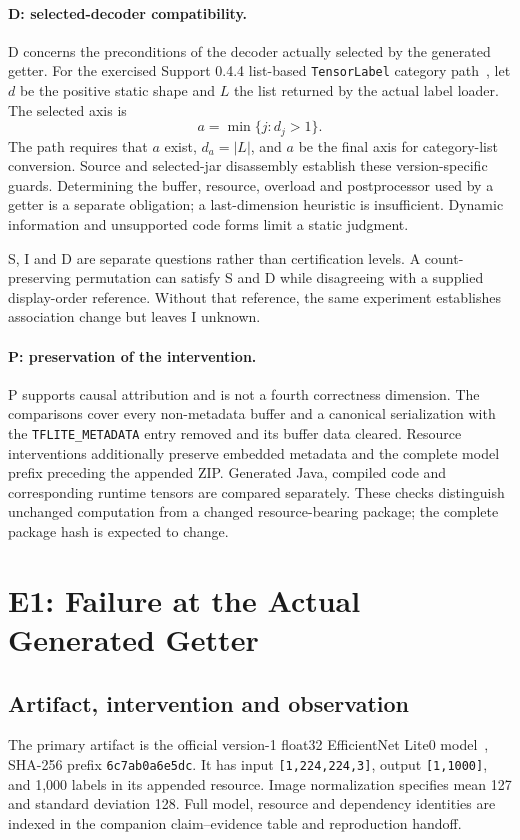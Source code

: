 \documentclass[10pt,conference]{IEEEtran}
\newcommand{\code}[1]{\texttt{#1}}
\begin{document}
\paragraph{D: selected-decoder compatibility.}
D concerns the preconditions of the decoder actually selected by the generated getter. For the exercised Support 0.4.4 list-based \code{TensorLabel} category path~\cite{tensorlabel}, let $d$ be the positive static shape and $L$ the list returned by the actual label loader. The selected axis is
\begin{equation}
a=\min\{j:d_j>1\}.
\end{equation}
The path requires that $a$ exist, $d_a=|L|$, and $a$ be the final axis for category-list conversion. Source and selected-jar disassembly establish these version-specific guards. Determining the buffer, resource, overload and postprocessor used by a getter is a separate obligation; a last-dimension heuristic is insufficient. Dynamic information and unsupported code forms limit a static judgment.

S, I and D are separate questions rather than certification levels. A count-preserving permutation can satisfy S and D while disagreeing with a supplied display-order reference. Without that reference, the same experiment establishes association change but leaves I unknown.

\paragraph{P: preservation of the intervention.}
P supports causal attribution and is not a fourth correctness dimension. The comparisons cover every non-metadata buffer and a canonical serialization with the \code{TFLITE\_METADATA} entry removed and its buffer data cleared. Resource interventions additionally preserve embedded metadata and the complete model prefix preceding the appended ZIP. Generated Java, compiled code and corresponding runtime tensors are compared separately. These checks distinguish unchanged computation from a changed resource-bearing package; the complete package hash is expected to change.

\section{E1: Failure at the Actual Generated Getter}
\label{sec:e1}
\subsection{Artifact, intervention and observation}
The primary artifact is the official version-1 float32 EfficientNet Lite0 model~\cite{efficientnet}, SHA-256 prefix \code{6c7ab0a6e5dc}. It has input \code{[1,224,224,3]}, output \code{[1,1000]}, and 1,000 labels in its appended resource. Image normalization specifies mean 127 and standard deviation 128. Full model, resource and dependency identities are indexed in the companion claim--evidence table and reproduction handoff.
\end{document}
